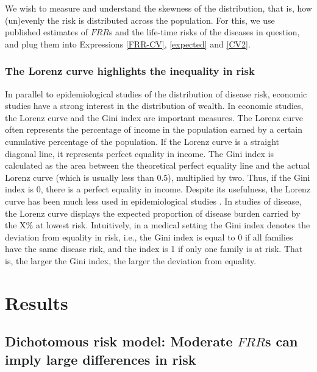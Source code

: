 \documentclass{bmcart}
\begin{document}
We wish to measure and understand the skewness of the distribution, that is, how (un)evenly the risk is distributed across the population. For this, we use published estimates of $FRR$s and the life-time risks of the diseases in question, and plug them into Expressions \eqref{FRR-CV}, \eqref{expected} and \eqref{CV2}.

\subsubsection*{The Lorenz curve highlights the inequality in risk}
In parallel to epidemiological studies of the distribution of disease risk, economic studies have a strong interest in the distribution of wealth. In economic studies, the Lorenz curve and the Gini index are important measures. The Lorenz curve often represents the percentage of income in the population earned by a certain cumulative percentage of the population. If the Lorenz curve is a straight diagonal line, it represents perfect equality in income. The Gini index is calculated as the area between the theoretical perfect equality line and the actual Lorenz curve (which is usually less than $0.5$), multiplied by two. Thus, if the Gini index is 0, there is a perfect equality in income. Despite its usefulness, the Lorenz curve has been much less used in epidemiological studies \cite{mauguen2016using}. In studies of disease, the Lorenz curve displays the expected proportion of disease burden carried by the X\% at lowest risk. Intuitively, in a medical setting the Gini index denotes the deviation from equality in risk, i.e., the Gini index is equal to 0 if all families have the same disease risk, and the index is 1 if only one family is at risk. That is, the larger the Gini index, the larger the deviation from equality.


\section*{Results}
\subsection*{Dichotomous risk model: Moderate $FRR$s can imply large differences in risk}
\label{dichotomous}
\end{document}
